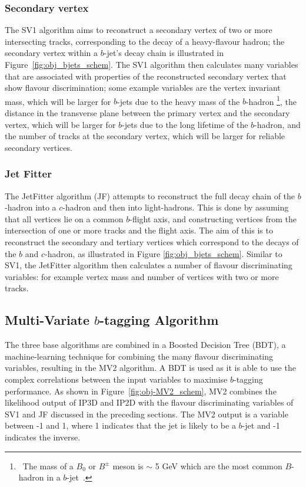 \subsubsection{Secondary vertex}
\label{sec:obj-bjets_SV}

The SV1 algorithm aims to reconstruct a secondary vertex of two or more intersecting tracks, corresponding to the decay of a heavy-flavour hadron;
the secondary vertex within a $b$-jet's decay chain is illustrated in Figure~\ref{fig:obj_bjets_schem}.
The SV1 algorithm then calculates many variables that are associated with properties of the reconstructed secondary vertex that show flavour discrimination;
some example variables are the vertex invariant mass,
which will be larger for $b$-jets due to the heavy mass of the $b$-hadron
\footnote{\ The mass of a $B_0$ or $B^\pm$ meson is $\sim$ 5 GeV which are the most common $B$-hadron in a $b$-jet~\cite{obj-bjets_PDG}.}, 
the distance in the transverse plane between the primary vertex and the secondary vertex, %
which will be larger for $b$-jets due to the long lifetime of the $b$-hadron,
and the number of tracks at the secondary vertex, which will be larger for reliable secondary vertices.

\subsubsection{Jet Fitter}
\label{sec:obj-bjets_JF}

The JetFitter algorithm (JF) attempts to reconstruct the full decay chain of the $b$-hadron into a $c$-hadron and then into light-hadrons. 
This is done by assuming that all vertices lie on a common $b$-flight axis, and constructing vertices from the intersection of
one or more tracks and the flight axis.
The aim of this is to reconstruct the secondary and tertiary vertices which correspond to the decays of the $b$ and $c$-hadron,
as illustrated in Figure \ref{fig:obj_bjets_schem}.
Similar to SV1, the JetFitter algorithm then calculates a number of flavour discriminating variables:
for example vertex mass and number of vertices with two or more tracks.

\subsection{Multi-Variate $b$-tagging Algorithm}
\label{sec:obj-bjets_MV2}

The three base algorithms are combined in a Boosted Decision Tree (BDT), a machine-learning technique for combining the many flavour discriminating variables,
resulting in the MV2 algorithm.
A BDT is used as it is able to use the complex correlations between the input variables to maximise $b$-tagging performance.
As shown in Figure~\ref{fig:obj-MV2_schem}, MV2 combines the likelihood output of IP3D and IP2D
with the flavour discriminating variables of SV1 and JF discussed in the preceding sections.
The MV2 output is a variable between -1 and 1, where 1 indicates that the jet is likely to be a $b$-jet and -1 indicates the inverse.

